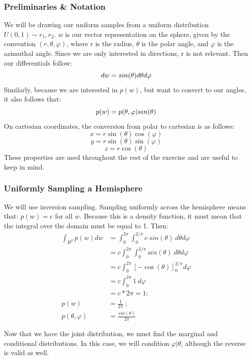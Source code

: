 \subsubsection*{Preliminaries \& Notation}
We will be drawing our uniform samples from a uniform distribution $U(0,1) \sim r_{1}, r_{2}$.\newline \newline
$w$ is our vector representation on the sphere, given by the convention $(r,\theta, \varphi)$, where r is the radius, $\theta$ is the polar angle, and $\varphi$ is the azimuthal angle. Since we are only interested in directions, r is not relevant. Then our differentials follow:
\[dw = sin(\theta)\space d\theta d\varphi\]
Similarly, because we are interested in $p(w)$, but want to convert to our angles, it also follows that:
\[p(w)=p(\theta, \varphi)\space sin(\theta)\] \newline
On cartesian coordinates, the conversion from polar to cartesian is as follows:
\[x=r\sin(\theta)\cos(\varphi)\]
\[y=r\sin(\theta)\sin(\varphi)\]
\[z=r\cos(\theta)
\]
These properties are used throughout the rest of the exercise and are useful to keep in mind.

\subsubsection*{Uniformly Sampling a Hemisphere}
We will use inversion sampling. Sampling uniformly across the hemisphere means that: $p(w)=c$ for all $w$. Because this is a density function, it must mean that the integral over the domain must be equal to 1. Then:
\begin{align*}
\int_{H^{2}}p(w) dw
&=\int_{0}^{2\pi}\int_{0}^{2/\pi}c\ sin(\theta)\ d\theta d\varphi \\
&= c\int_{0}^{2\pi}\int_{0}^{2/\pi}sin(\theta) \ d\theta d\varphi \\
&= c\int_{0}^{2\pi}\left[-\cos(\theta)\right]^{2/\pi}_{0} d\varphi \\
&= c\int_{0}^{2\pi}1\ d\varphi \\
&=c*2\pi=1; \\ 
p(w) &=\frac{1}{2\pi}\ ;\\
p(\theta, \varphi) &= \frac{sin(\theta)}{2\pi} 
\end{align*}

Now that we have the joint distribution, we must find the marginal and conditional distributions. In this case, we will condition $\varphi\vert\theta$, although the reverse is valid as well.

